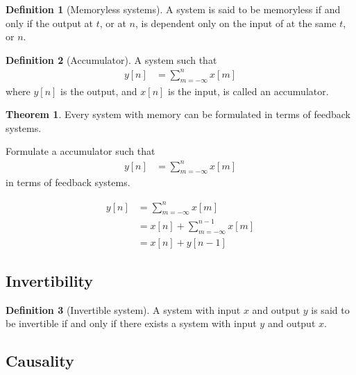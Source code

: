 \documentclass[titlepage, fleqn, a4paper, 12pt, twoside]{article}
\theoremstyle{definition}
\newtheorem{definition}{Definition}
\theoremstyle{theorem}
\newtheorem{theorem}{Theorem}
\begin{document}
\begin{definition}[Memoryless systems]
	A system is said to be memoryless if and only if the output at $t$, or at $n$, is dependent only on the input of at the same $t$, or $n$.
\end{definition}

\begin{definition}[Accumulator]
	A system such that
	\begin{align*}
		y[n] & = \sum\limits_{m = -\infty}^{n} x[m]
	\end{align*}
	where $y[n]$ is the output, and $x[n]$ is the input, is called an accumulator.
\end{definition}

\begin{theorem}
	Every system with memory can be formulated in terms of feedback systems.
\end{theorem}

\begin{question}
	Formulate a accumulator such that
	\begin{align*}
		y[n] & = \sum\limits_{m = -\infty}^{n} x[m]
	\end{align*}
	in terms of feedback systems.
\end{question}

\begin{solution}
	\begin{align*}
		y[n] & = \sum\limits_{m = -\infty}^{n} x[m]            \\
                     & = x[n] + \sum\limits_{m = -\infty}^{n - 1} x[m] \\
                     & = x[n] + y[n - 1]
	\end{align*}
\end{solution}

\subsection{Invertibility}

\begin{definition}[Invertible system]
	A system with input $x$ and output $y$ is said to be invertible if and only if there exists a system with input $y$ and output $x$.
\end{definition}

\subsection{Causality}
\end{document}
